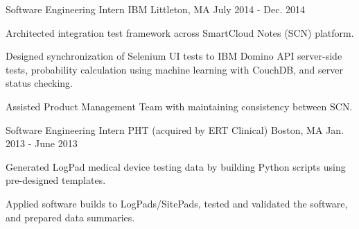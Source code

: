 \begin{cventries}

  \cventry
    {Software Engineering Intern} %
    {IBM} %
    {Littleton, MA} %
    {July 2014 - Dec. 2014} %
    {
      \begin{cvitems} %
        \item {Architected integration test framework across SmartCloud Notes (SCN) platform.}
        \item {Designed synchronization of Selenium UI tests to IBM Domino API server-side tests, probability calculation using machine learning with CouchDB, and server status checking.}
        \item {Assisted Product Management Team with maintaining consistency between SCN.}
      \end{cvitems}
    }


  \cventry
    {Software Engineering Intern} %
    {PHT (acquired by ERT Clinical)} %
    {Boston, MA} %
    {Jan. 2013 - June 2013} %
    {
      \begin{cvitems} %
        \item {Generated LogPad medical device testing data by building Python scripts using pre-designed templates.}
        \item {Applied software builds to LogPads/SitePads, tested and validated the software, and prepared data summaries.}
      \end{cvitems}
    }

\end{cventries}